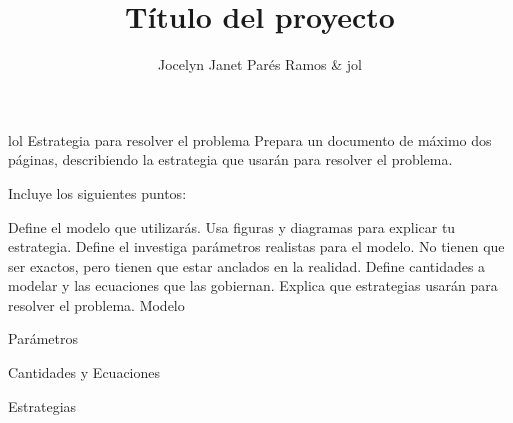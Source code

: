 \documentclass[stu,12pt,floatsintext,draftfirst,spanish]{report}
\title{Título del proyecto}
\author{Jocelyn Janet Parés Ramos & jol}
\begin{document}
\maketitle 

lol
 Estrategia para resolver el problema
Prepara un documento de máximo dos páginas, describiendo la estrategia que usarán para resolver el problema.

Incluye los siguientes puntos:

Define el modelo que utilizarás. Usa figuras y diagramas para explicar tu estrategia.
Define el investiga parámetros realistas para el modelo. No tienen que ser exactos, pero tienen que estar anclados en la realidad.
Define cantidades a modelar y las ecuaciones que las gobiernan.
Explica que estrategias usarán para resolver el problema.
 Modelo 

 Parámetros

 Cantidades y Ecuaciones

 Estrategias

\end{document}
